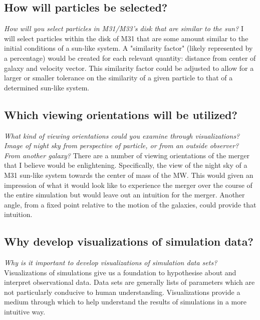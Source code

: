 \documentclass[twocolumn]{aastex63}
\begin{document}
\subsection{How will particles be selected?}
\emph{How will you select particles in M31/M33’s disk that are similar to the sun?} I will select particles within the disk of M31 that are some amount similar to the initial conditions of a sun-like system. A "similarity factor" (likely represented by a percentage) would be created for each relevant quantity: distance from center of galaxy and velocity vector. This similarity factor could be adjusted to allow for a larger or smaller tolerance on the similarity of a given particle to that of a determined sun-like system.  

\subsection{Which viewing orientations will be utilized?}
\emph{What kind of viewing orientations could you examine through visualizations? Image of night sky from perspective of particle, or from an outside observer? From another galaxy?} There are a number of viewing orientations of the merger that I believe would be enlightening. Specifically, the view of the night sky of a M31 sun-like system towards the center of mass of the MW. This would given an impression of what it would look like to experience the merger over the course of the entire simulation but would leave out an intuition for the merger. Another angle, from a fixed point relative to the motion of the galaxies, could provide that intuition.

\subsection{Why develop visualizations of simulation data?}
\emph{Why is it important to develop visualizations of simulation data sets?} Visualizations of simulations give us a foundation to hypothesise about and interpret observational data. Data sets are generally lists of parameters which are not particularly conducive to human understanding. Visualizations provide a medium through which to help understand the results of simulations in a more intuitive way.
\end{document}
